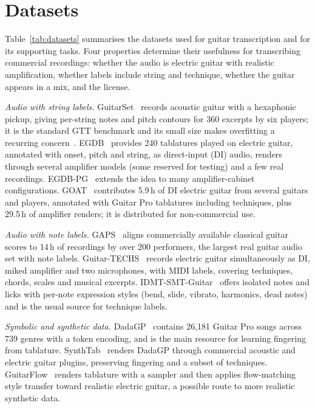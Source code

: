 \section{Datasets}
\label{sec:datasets}

Table~\ref{tab:datasets} summarises the datasets used for guitar transcription
and for its supporting tasks. Four properties determine their usefulness for
transcribing commercial recordings: whether the audio is electric guitar with
realistic amplification, whether labels include string and technique, whether
the guitar appears in a mix, and the license.

\emph{Audio with string labels.} GuitarSet~\cite{xi2018guitarset} records
acoustic guitar with a hexaphonic pickup, giving per-string notes and pitch
contours for 360 excerpts by six players; it is the standard GTT benchmark and
its small size makes overfitting a recurring concern~\cite{zang2024synthtab}.
EGDB~\cite{chen2022egdb} provides 240 tablatures played on electric guitar,
annotated with onset, pitch and string, as direct-input (DI) audio, renders
through several amplifier models (some reserved for testing) and a few real
recordings. EGDB-PG~\cite{chen2025egdbpg}
extends the idea to many amplifier-cabinet configurations.
GOAT~\cite{loth2025goat} contributes 5.9\,h of DI electric guitar from several
guitars and players, annotated with Guitar Pro tablatures including
techniques, plus 29.5\,h of amplifier renders; it is distributed for
non-commercial use.

\emph{Audio with note labels.} GAPS~\cite{riley2024gaps} aligns commercially
available classical guitar scores to 14\,h of recordings by over 200
performers, the largest real guitar audio set with note labels.
Guitar-TECHS~\cite{pedroza2025guitartechs} records electric guitar
simultaneously as DI, miked amplifier and two microphones, with MIDI labels,
covering techniques, chords, scales and musical excerpts.
IDMT-SMT-Guitar~\cite{kehling2014idmt} offers isolated notes and licks with
per-note expression styles (bend, slide, vibrato, harmonics, dead notes) and is
the usual source for technique labels.

\emph{Symbolic and synthetic data.} DadaGP~\cite{sarmento2021dadagp} contains
26,181 Guitar Pro songs across 739 genres with a token encoding, and is the
main resource for learning fingering from tablature. SynthTab~\cite{zang2024synthtab}
renders DadaGP through commercial acoustic and electric guitar plugins,
preserving fingering and a subset of techniques. GuitarFlow~\cite{loth2025guitarflow}
renders tablature with a sampler and then applies flow-matching style transfer
toward realistic electric guitar, a possible route to more realistic
synthetic data.

